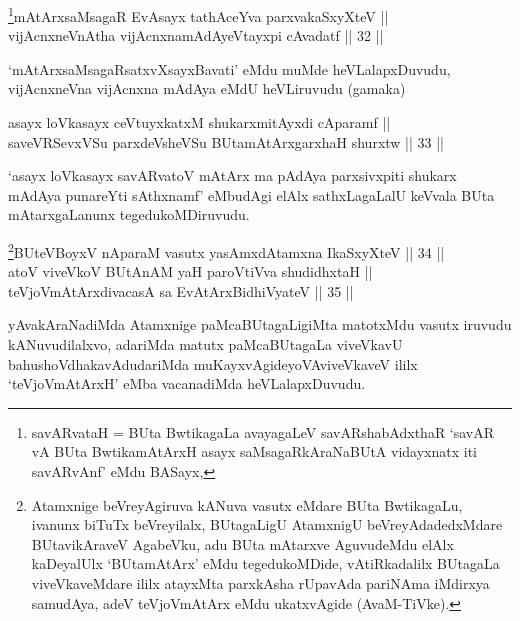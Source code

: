\begin{shl}
\footnote{savARvataH = BUta BwtikagaLa avayagaLeV savARshabAdxthaR `savAR vA BUta BwtikamAtArxH asayx saMsagaRkAraNaBUtA vidayxnatx iti savARvAnf' eMdu BASayx,}mAtArxsaMsagaR EvAsayx tathAceYva parxvakaSxyXteV || \\
vijAcnxneVnAtha vijAcnxnamAdAyeVtayxpi cAvadatf \hfill || 32 || 
\end{shl}

\begin{artha}
`mAtArx\s saMsagaRsatxvXsayxBavati' eMdu muMde
heVLalapxDuvudu, vijAcnxneVna vijAcnxna mAdAya eMdU heVLiruvudu
(gamaka)
\end{artha}

\begin{shl}
asayx loVkasayx ceVtuyxkatxM shukarxmitAyxdi cAparamf || \\
saveVRSevxVSu parxdeVsheVSu BUtamAtArxgarxhaH shurxtw \hfill || 33 ||  
\end{shl}

\begin{artha}
`asayx loVkasayx savARvatoV mAtArx ma pAdAya parxsivxpiti shukarx mAdAya punareYti sAthxnamf' eMbudAgi elAlx sathxLagaLalU keVvala BUta mAtarxgaLanunx
tegedukoMDiruvudu.
\end{artha}

\begin{shl}
\footnote{Atamxnige beVreyAgiruva kANuva vasutx eMdare BUta BwtikagaLu, ivanunx biTuTx beVreyilalx, BUtagaLigU AtamxnigU beVreyAdadedxMdare BUtavikAraveV AgabeVku, adu BUta mAtarxve AguvudeMdu elAlx kaDeyalUlx `BUtamAtArx' eMdu tegedukoMDide, vAtiRkadalilx BUtagaLa viveVka\-veMdare ililx atayxMta parxkAsha rUpavAda pariNAma iMdirxya samudAya, adeV teVjoVmAtArx eMdu ukatxvAgide (AvaM-TiVke).}BUteVBoyxV nAparaM vasutx yasAmxdAtamxna IkaSxyXteV \hfill || 34 || \\ 
atoV viveVkoV BUtAnAM yaH paroV\s tiVva shudidhxtaH || \\
teVjoVmAtArxdivacasA sa EvAtArxBidhiVyateV \hfill || 35 ||  
\end{shl}

\begin{artha}
yAvakAraNadiMda Atamxnige paMcaBUtagaLigiMta matotxMdu vasutx iruvudu
kANuvudilalxvo, adariMda matutx paMcaBUtagaLa viveVkavU
bahushoVdhakavAdudariMda muKayxvAgideyoV\break AviveVkaveV ililx
`teVjoVmAtArxH' eMba vacanadiMda heVLalapxDuvudu.
\end{artha}


